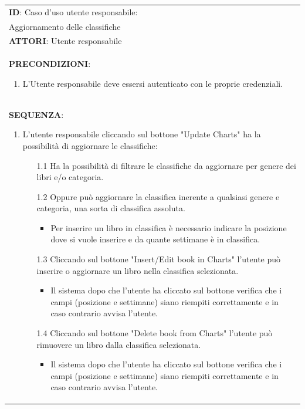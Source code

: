 \documentclass[a4paper,11pt]{report}
\begin{document}
  \begin{table}[h!]
    \renewcommand*{\arraystretch}{1.2}
    \centering
    \begin{tabularx}{\textwidth}{|X|} \hline
      \textbf{ID}: Caso d'uso utente responsabile: \\Aggiornamento delle classifiche\\
      \hline
      \textbf{ATTORI}: Utente responsabile \\
      \hline
      \textbf{PRECONDIZIONI}:
      \begin{enumerate}
        \item L'Utente responsabile deve essersi autenticato con le proprie credenziali.
      \end{enumerate} \\
      \hline
      \textbf{SEQUENZA}:
      \begin{enumerate}
        \item L'utente responsabile cliccando sul bottone "Update Charts" ha la possibilità di aggiornare le classifiche:
        \begin{enumerate}
            \item [1.1] Ha la possibilità di filtrare le classifiche da aggiornare per genere dei libri e/o categoria.
            \item [1.2] Oppure può aggiornare la classifica inerente a qualsiasi genere e categoria, una sorta di classifica assoluta.
            \begin{itemize}
                \item Per inserire un libro in classifica è necessario indicare la posizione dove si vuole inserire e da quante settimane è in classifica.
            \end{itemize}
            \item [1.3] Cliccando sul bottone "Insert/Edit book in Charts" l'utente può inserire o aggiornare un libro nella classifica selezionata.
            \begin{itemize}
                \item Il sistema dopo che l'utente ha cliccato sul bottone verifica che i campi (posizione e settimane) siano riempiti correttamente e in caso contrario avvisa l'utente.
            \end{itemize}
            \item [1.4] Cliccando sul bottone "Delete book from Charts" l'utente può rimuovere un libro dalla classifica selezionata.
            \begin{itemize}
                \item Il sistema dopo che l'utente ha cliccato sul bottone verifica che i campi (posizione e settimane) siano riempiti correttamente e in caso contrario avvisa l'utente.

\end{itemize}
\end{enumerate}
\end{enumerate}
\end{tabularx}
\end{table}
\end{document}
